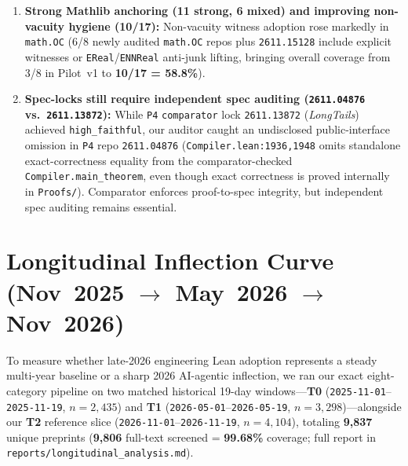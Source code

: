 \documentclass[11pt,letterpaper]{article}
\begin{document}
\begin{enumerate}
  \item \textbf{Strong Mathlib anchoring (11 strong, 6 mixed) and improving non-vacuity hygiene (10/17):} Non-vacuity witness adoption rose markedly in \texttt{math.OC} (6/8 newly audited \texttt{math.OC} repos plus \texttt{2611.15128} include explicit witnesses or \texttt{EReal}/\texttt{ENNReal} anti-junk lifting, bringing overall coverage from 3/8 in Pilot~v1 to \textbf{10/17 = 58.8\%}).
  \item \textbf{Spec-locks still require independent spec auditing (\texttt{2611.04876} vs.\ \texttt{2611.13872}):} While \texttt{P4} \texttt{comparator} lock \texttt{2611.13872} (\emph{LongTails}) achieved \texttt{high\_faithful}, our auditor caught an undisclosed public-interface omission in \texttt{P4} repo \texttt{2611.04876} (\texttt{Compiler.lean:1936,1948} omits standalone exact-correctness equality from the comparator-checked \texttt{Compiler.main\_theorem}, even though exact correctness is proved internally in \texttt{Proofs/}). Comparator enforces proof-to-spec integrity, but independent spec auditing remains essential.
\end{enumerate}

\section{Longitudinal Inflection Curve (Nov~2025 \texorpdfstring{$\rightarrow$}{->} May~2026 \texorpdfstring{$\rightarrow$}{->} Nov~2026)}
\label{sec:longitudinal}

To measure whether late-2026 engineering Lean adoption represents a steady multi-year baseline or a sharp 2026 AI-agentic inflection, we ran our exact eight-category pipeline on two matched historical 19-day windows---\textbf{T0} (\texttt{2025-11-01}--\texttt{2025-11-19}, $n=2{,}435$) and \textbf{T1} (\texttt{2026-05-01}--\texttt{2026-05-19}, $n=3{,}298$)---alongside our \textbf{T2} reference slice (\texttt{2026-11-01}--\texttt{2026-11-19}, $n=4{,}104$), totaling \textbf{9,837} unique preprints (\textbf{9,806} full-text screened = \textbf{99.68\%} coverage; full report in \texttt{reports/longitudinal\_analysis.md}).
\end{document}
